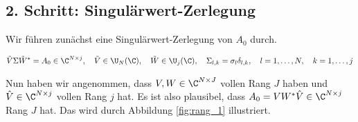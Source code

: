 \subsection*{2. Schritt: Singulärwert-Zerlegung}

Wir führen zunächst eine Singulärwert-Zerlegung von $A_0$ durch.

\begin{align*}
    \tilde V \Sigma \tilde W^\ast = A_0 \in \C^{N \times j},
    \quad
    \tilde V \in \U_N(\C),
    \quad
    \tilde W \in \U_j(\C),
    \quad
    \Sigma_{l, k} = \sigma_l \delta_{l, k},
    \quad
    l = 1, \dots, N,
    \quad
    k = 1, \dots, j
\end{align*}

Nun haben wir angenommen, dass $V, W \in \C^{N \times J}$ vollen Rang $J$ haben und $\hat V \in \C^{N \times j}$ vollen Rang $j$ hat.
Es ist also plausibel, dass $A_0 = V W^\ast \hat V \in \C^{N \times j}$ Rang $J$ hat.
Das wird durch Abbildung \ref{fig:rang_1} illustriert.

